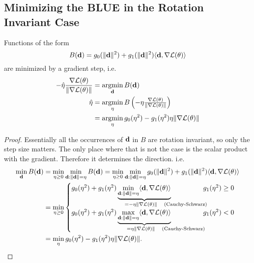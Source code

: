 \subsection{Minimizing the BLUE in the Rotation Invariant Case}

\begin{lemma}\label{lem: rotation invariant implies GD}
	Functions of the form
	\begin{equation*}
		B(\mathbf{d})
		= g_0(\|\mathbf{d}\|^2) + g_1(\|\mathbf{d}\|^2)\langle \mathbf{d}, \nabla\mathcal{L}(\theta)\rangle
	\end{equation*}
	are minimized by a gradient step, i.e.
	\begin{align}
		-\hat{\eta}\frac{\nabla\mathcal{L}(\theta)}{\|\nabla\mathcal{L}(\theta)\|}
		&= \operatorname*{argmin}_{\mathbf{d}}B(\mathbf{d})\\
		\hat{\eta} &\begin{aligned}[t]
			&=\operatorname*{argmin}_{\eta} B\left(-\eta \tfrac{\nabla\mathcal{L}(\theta)}{\|\nabla\mathcal{L}(\theta)\|}\right)\\
			&= \operatorname*{argmin}_{\eta} g_0(\eta^2) -  g_1(\eta^2)\eta\|\nabla\mathcal{L}(\theta)\|
		\end{aligned}
	\end{align}
\end{lemma}

\begin{proof}
	Essentially all the occurrences of \(\mathbf{d}\) in \(B\) are
	rotation invariant, so only the step size matters. The only place where that
	is not the case is the scalar product with the gradient. Therefore it
	determines the direction. i.e.
	\begin{align*}
		\min_{\step} B(\step)
		&= \min_{\lr\ge 0}\min_{\step:\|\step\|=\lr} B(\step)
		= \min_{\lr\ge 0}\min_{\step:\|\step\|=\lr}
		g_0(\|\step\|^2)	
		+ g_1(\|\step\|^2) \langle \step, \grad\Loss(\param)\rangle\\
		&= \min_{\lr\ge 0}
		\begin{cases}
			g_0(\lr^2)	
			+ g_1(\lr^2)
			\underbrace{\min_{\step:\|\step\|=\lr}\langle \step, \grad\Loss(\param)\rangle}_{
				= -\eta \|\grad \Loss(\param)\| \quad \mathrlap{\text{(Cauchy-Schwarz)}}
			}\hphantom{\text{Schwarz}} & g_1(\lr^2) \ge 0
			\\
			g_0(\lr^2)	
			+ g_1(\lr^2)
			\underbrace{\max_{\step:\|\step\|=\lr}\langle \step, \grad\Loss(\param)\rangle}_{
				= \eta \|\grad \Loss(\param)\| \quad \mathrlap{\text{(Cauchy-Schwarz)}}
			}\hphantom{\text{Schwarz}} & g_1(\lr^2) < 0
		\end{cases}\\
		&= \min_{\lr} g_0(\lr^2)	
			- g_1(\lr^2)\lr \|\grad\Loss(\param)\|.
		\qedhere
	\end{align*}
\end{proof}

